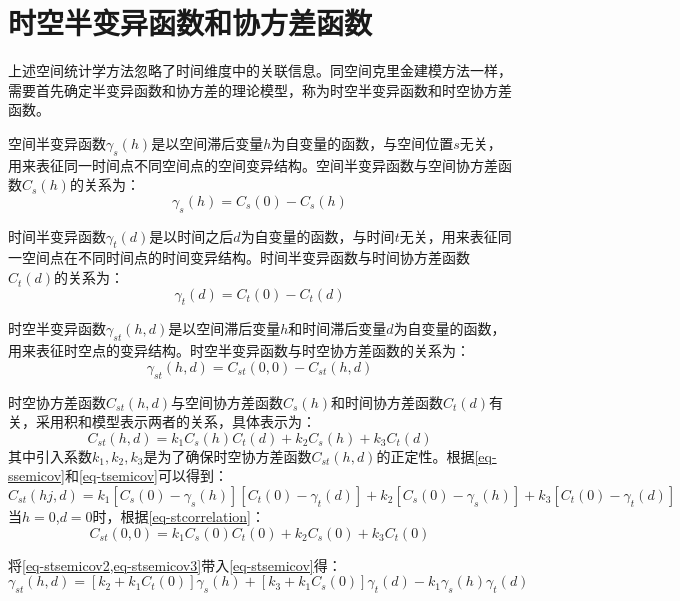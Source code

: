 \section{时空半变异函数和协方差函数}
上述空间统计学方法忽略了时间维度中的关联信息。同空间克里金建模方法一样，需要首先确定半变异函数和协方差的理论模型，称为时空半变异函数和时空协方差函数。

空间半变异函数$\gamma_s(h)$是以空间滞后变量$h$为自变量的函数，与空间位置$s$无关，用来表征同一时间点不同空间点的空间变异结构。空间半变异函数与空间协方差函数$C_s(h)$的关系为：
\begin{equation}
    \gamma_s(h) = C_s(0) - C_s(h)
    \label{eq-ssemicov}
\end{equation}

时间半变异函数$\gamma_t(d)$是以时间之后$d$为自变量的函数，与时间$t$无关，用来表征同一空间点在不同时间点的时间变异结构。时间半变异函数与时间协方差函数$C_t(d)$的关系为：
\begin{equation}
    \gamma_t(d) = C_t(0)-C_t(d)
    \label{eq-tsemicov}
\end{equation}

时空半变异函数$\gamma_{st}(h,d)$是以空间滞后变量$h$和时间滞后变量$d$为自变量的函数，用来表征时空点的变异结构。时空半变异函数与时空协方差函数的关系为：
\begin{equation}
    \gamma_{st}(h,d) = C_{st}(0,0) - C_{st}(h,d)
    \label{eq-stsemicov}
\end{equation}

时空协方差函数$C_{st}(h,d)$与空间协方差函数$C_s(h)$和时间协方差函数$C_t(d)$有关，采用积和模型表示两者的关系，具体表示为：
\begin{equation}
    C_{st}(h,d) = k_1C_s(h)C_t(d) + k_2C_s(h)+k_3C_t(d)
    \label{eq-stcorrelation}
\end{equation}
其中引入系数$k_1,k_2,k_3$是为了确保时空协方差函数$C_{st}(h,d)$的正定性。根据\cref{eq-ssemicov}和\cref{eq-tsemicov}可以得到：
\begin{equation}
    C_{st}(hj,d) = k_1\left[ C_s(0) - \gamma_s(h) \right]\left[ C_t(0) - \gamma_t(d) \right] + k_2\left[ C_s(0) - \gamma_s(h) \right]+k_3\left[ C_t(0)-\gamma_t(d) \right]
    \label{eq-stsemicov2}
\end{equation}
当$h=0$,$d=0$时，根据\cref{eq-stcorrelation}：
\begin{equation}
    C_{st}(0,0) = k_1C_s(0)C_t(0) + k_2C_s(0) + k_3C_t(0)
    \label{eq-stsemicov3}
\end{equation}

将\cref{eq-stsemicov2,eq-stsemicov3}带入\cref{eq-stsemicov}得：
\begin{equation}
    \gamma_{st}(h,d) = \left[ k_2 +k_1 C_t(0) \right]\gamma_s(h)+ \left[ k_3+k_1C_s(0) \right]\gamma_t(d)-k_1\gamma_s(h)\gamma_t(d)
    \label{eq-stsemicov4}
\end{equation}


